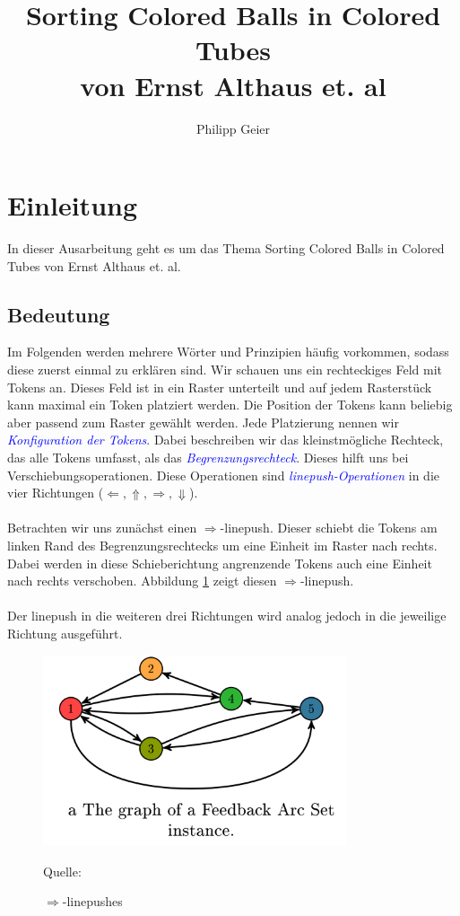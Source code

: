 \documentclass[seminar,german]{algothesis}
\title{Sorting Colored Balls in Colored Tubes \\ von Ernst Althaus et. al} %
\author{Philipp Geier} %
\newcommand*{\quelle}{%
  \footnotesize Quelle:
}
\begin{document}
\setcounter{page}{1}
\section{Einleitung}
In dieser Ausarbeitung geht es um das Thema \glqq Sorting Colored Balls in Colored Tubes \grqq{} von Ernst Althaus et. al. 
\subsection{Bedeutung}
Im Folgenden werden mehrere Wörter und Prinzipien häufig vorkommen, sodass diese zuerst einmal zu erklären sind. Wir schauen uns ein rechteckiges Feld mit Tokens an. Dieses Feld ist in  ein Raster unterteilt und auf jedem Rasterstück kann maximal ein Token platziert werden. Die Position der Tokens kann beliebig aber passend zum Raster gewählt werden. Jede Platzierung nennen wir \textit{\textcolor{blue}{Konfiguration der Tokens}}.  Dabei beschreiben wir das kleinstmögliche Rechteck, das alle Tokens umfasst, als das \textit{\textcolor{blue}{Begrenzungsrechteck}}. Dieses hilft uns bei Verschiebungsoperationen. Diese Operationen sind \textit{\textcolor{blue}{\glqq linepush\grqq{}-Operationen}} in die vier Richtungen ($\Leftarrow, \Uparrow, \Rightarrow, \Downarrow$). 
\\\\
Betrachten wir uns zunächst einen $\Rightarrow$-linepush. Dieser schiebt die Tokens am linken Rand des Begrenzungsrechtecks um eine Einheit im Raster nach rechts. Dabei werden in diese Schieberichtung angrenzende Tokens auch eine Einheit nach rechts verschoben. Abbildung \ref{fig:1} zeigt diesen $\Rightarrow$-linepush. 
\\\\
Der linepush in die weiteren drei Richtungen wird analog jedoch in die jeweilige Richtung ausgeführt.\\
\begin{figure}[ht]
	\centering
	\includegraphics[width=0.8\textwidth]{graph}
	\caption{$\Rightarrow$-linepushes}
	\quelle\cite{akitaya2022pushing}
	\label{fig:1}
\end{figure}
\end{document}
